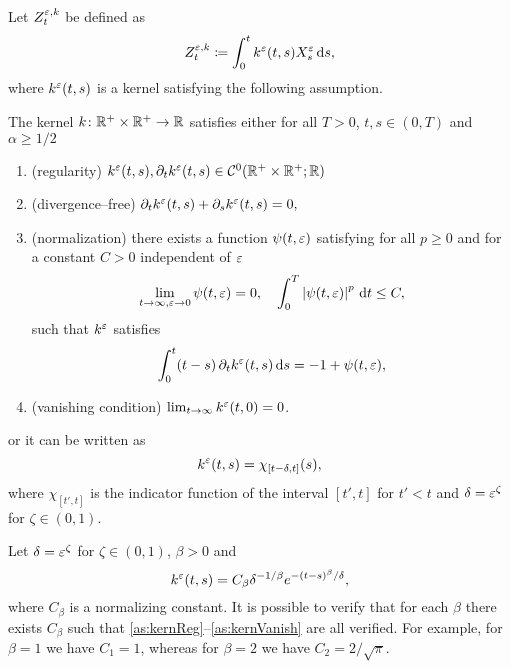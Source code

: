 \documentclass[10pt]{article}
\begin{document}
Let $Z^{\varepsilon,k}_t$ be defined as
\begin{equation}
	Z^{\varepsilon,k}_t \coloneqq \int_0^t k^\varepsilon(t, s)X^\varepsilon_s \,\mathrm{d} s,
\end{equation}
where $k^\varepsilon(t, s)$ is a kernel satisfying the following assumption.
\begin{assumption} The kernel $k \colon \mathbb{R}^+ \times \mathbb{R}^+ \to \mathbb{R}$ satisfies either for all $T > 0$, $t, s \in (0, T)$ and $\alpha \geq 1/2$
\begin{enumerate}
	\item \label{as:kernReg} (regularity) $k^\varepsilon(t, s), \partial_t k^\varepsilon(t, s) \in \mathcal C^0(\mathbb{R}^+\times\mathbb{R}^+; \mathbb{R})$ 
	\item \label{as:kernDivFree} (divergence--free) $\partial_t k^\varepsilon(t, s) + \partial_s k^\varepsilon(t, s) = 0, $
	\item \label{as:kernNorm} (normalization) there exists a function $\psi(t, \varepsilon)$ satisfying for all $p \geq 0$ and for a constant $C > 0$ independent of $\varepsilon$
	\begin{equation}
		\lim_{t \to \infty, \varepsilon \to 0}\psi(t, \varepsilon) = 0, \quad \int_0^T \left\lvert\psi(t, \varepsilon)\right\rvert^p \,\mathrm{d} t \leq C,
	\end{equation}
	such that $k^\varepsilon$ satisfies
	\begin{equation}
		\int_0^t (t-s) \, \partial_t k^\varepsilon(t, s) \,\mathrm{d} s = -1 + \psi(t, \varepsilon),
	\end{equation}
	\item\label{as:kernVanish} (vanishing condition) $\lim_{t \to \infty} k^\varepsilon(t, 0) = 0$. 
\end{enumerate}	
or it can be written as
\begin{equation}
	k^\varepsilon(t,s) = \chi_{[t-\delta, t]}(s),
\end{equation}
where $\chi_{[t', t]}$ is the indicator function of the interval $[t', t]$ for $t' < t$ and $\delta = \varepsilon^\zeta$ for $\zeta \in (0, 1)$.
\end{assumption}

\begin{example} Let $\delta = \varepsilon^\zeta$ for $\zeta \in (0, 1)$, $\beta > 0$ and
	\begin{equation}
		k^\varepsilon(t, s) = C_{\beta} \delta^{-1/\beta} e^{-(t-s)^\beta/\delta},
	\end{equation}
	where $C_{\beta}$ is a normalizing constant. It is possible to verify that for each $\beta$ there exists $C_\beta$ such that \ref{as:kernReg}--\ref{as:kernVanish} are all verified. For example, for $\beta = 1$ we have $C_1 = 1$, whereas for $\beta = 2$ we have $C_2 = 2/\sqrt{\pi}$.
\end{example}
\end{document}
